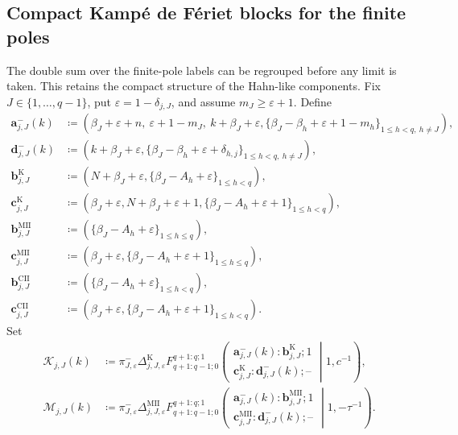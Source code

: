 \documentclass[10pt]{amsart}
\theoremstyle{plain}
\theoremstyle{definition}
\theoremstyle{remark}
\begin{document}
\subsection{Compact Kamp\'e de F\'eriet blocks for the finite poles}

The double sum over the finite-pole labels can be regrouped before any
limit is taken.  This retains the compact structure of the Hahn-like
components.  Fix $J\in\{1,\ldots,q-1\}$, put
\(\varepsilon=1-\delta_{j,J}\), and assume
\(m_J\ge\varepsilon+1\).  Define
\begin{align*}
 \boldsymbol a_{j,J}^{-}(k)
 &\coloneq\left(
 \beta_J+\varepsilon+n,\ \varepsilon+1-m_J,\
 k+\beta_J+\varepsilon,
 \{\beta_J-\beta_h+\varepsilon+1-m_h\}_{
                 1\le h<q,\ h\ne J}\right),\\
 \boldsymbol d_{j,J}^{-}(k)
 &\coloneq\left(k+\beta_J+\varepsilon,
 \{\beta_J-\beta_h+\varepsilon+\delta_{h,j}\}_{
                 1\le h<q,\ h\ne J}\right),\\
 \boldsymbol b_{j,J}^{\mathrm K}
 &\coloneq\left(N+\beta_J+\varepsilon,
 \{\beta_J-A_h+\varepsilon\}_{1\le h<q}\right),\\
 \boldsymbol c_{j,J}^{\mathrm K}
 &\coloneq\left(\beta_J+\varepsilon,
 N+\beta_J+\varepsilon+1,
 \{\beta_J-A_h+\varepsilon+1\}_{1\le h<q}\right),\\
 \boldsymbol b_{j,J}^{\mathrm{MII}}
 &\coloneq\left(\{\beta_J-A_h+\varepsilon\}_{1\le h\le q}\right),\\
 \boldsymbol c_{j,J}^{\mathrm{MII}}
 &\coloneq\left(\beta_J+\varepsilon,
 \{\beta_J-A_h+\varepsilon+1\}_{1\le h\le q}\right),\\
 \boldsymbol b_{j,J}^{\mathrm{CII}}
 &\coloneq\left(\{\beta_J-A_h+\varepsilon\}_{1\le h<q}\right),\\
 \boldsymbol c_{j,J}^{\mathrm{CII}}
 &\coloneq\left(\beta_J+\varepsilon,
 \{\beta_J-A_h+\varepsilon+1\}_{1\le h<q}\right).
\end{align*}
Set
\begin{align}
 \mathscr K_{j,J}(k)
 &\coloneq \pi_{J,\varepsilon}^{-}
 \Delta_{j,J,\varepsilon}^{\mathrm K}
 F_{q+1:q-1;0}^{q+1:q;1}
 \left(
 \begin{matrix}
  \boldsymbol a_{j,J}^{-}(k):
  \boldsymbol b_{j,J}^{\mathrm K};1\\
  \boldsymbol c_{j,J}^{\mathrm K}:
  \boldsymbol d_{j,J}^{-}(k);\text{--}
 \end{matrix}
 \middle|1,c^{-1}\right),
 \label{eq:K-compact-finite-pole-block}\\
 \mathscr M_{j,J}(k)
 &\coloneq \pi_{J,\varepsilon}^{-}
 \Delta_{j,J,\varepsilon}^{\mathrm{MII}}
 F_{q+1:q-1;0}^{q+1:q;1}
 \left(
 \begin{matrix}
  \boldsymbol a_{j,J}^{-}(k):
  \boldsymbol b_{j,J}^{\mathrm{MII}};1\\
  \boldsymbol c_{j,J}^{\mathrm{MII}}:
  \boldsymbol d_{j,J}^{-}(k);\text{--}
 \end{matrix}
 \middle|1,-\tau^{-1}\right).
 \label{eq:MII-compact-finite-pole-block}
\end{align}
\end{document}

